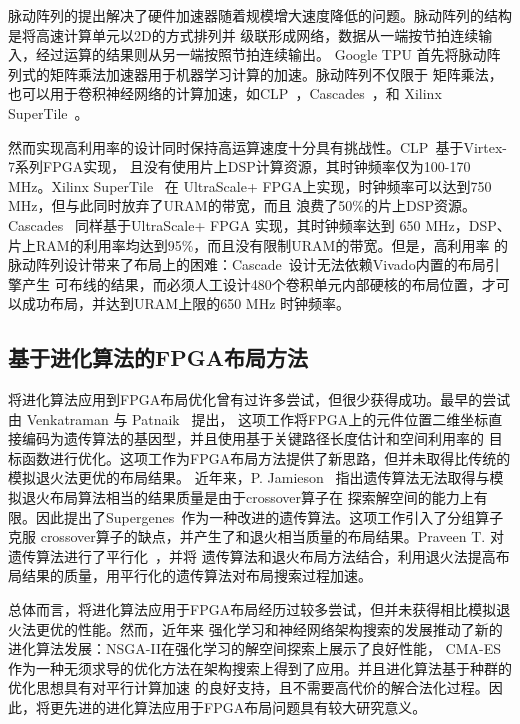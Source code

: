 脉动阵列的提出解决了硬件加速器随着规模增大速度降低的问题。脉动阵列的结构是将高速计算单元以2D的方式排列并
级联形成网络，数据从一端按节拍连续输入，经过运算的结果则从另一端按照节拍连续输出。
Google TPU 首先将脉动阵列式的矩阵乘法加速器用于机器学习计算的加速。脉动阵列不仅限于
矩阵乘法，也可以用于卷积神经网络的计算加速，如CLP~\cite{yongming_systolic-clp_isca2017,yongming_systolic-clp_fpl2016}，Cascades~\cite{nachiket_stc_fpl2019}，和 Xilinx SuperTile~\cite{supertile_fpga19, supertile_fpl17}。

然而实现高利用率的设计同时保持高运算速度十分具有挑战性。CLP~\cite{yongming_systolic-clp_isca2017,yongming_systolic-clp_fpl2016}基于Virtex-7系列FPGA实现，
且没有使用片上DSP计算资源，其时钟频率仅为100-170 MHz。Xilinx SuperTile~\cite{supertile_fpga19, supertile_fpl17} 在
UltraScale+ FPGA上实现，时钟频率可以达到750 MHz，但与此同时放弃了URAM的带宽，而且
浪费了50\%的片上DSP资源。Cascades~\cite{nachiket_stc_fpl2019} 同样基于UltraScale+ FPGA 实现，其时钟频率达到
650 MHz，DSP、片上RAM的利用率均达到95\%，而且没有限制URAM的带宽。但是，高利用率
的脉动阵列设计带来了布局上的困难：Cascade~\cite{nachiket_stc_fpl2019}设计无法依赖Vivado内置的布局引擎产生
可布线的结果，而必须人工设计480个卷积单元内部硬核的布局位置，才可以成功布局，并达到URAM上限的650 MHz
时钟频率。

\subsection{基于进化算法的FPGA布局方法}

将进化算法应用到FPGA布局优化曾有过许多尝试，但很少获得成功。最早的尝试由 Venkatraman 与 Patnaik~\cite{venkatraman2000evolutionary} 提出，
这项工作将FPGA上的元件位置二维坐标直接编码为遗传算法的基因型，并且使用基于关键路径长度估计和空间利用率的
目标函数进行优化。这项工作为FPGA布局方法提供了新思路，但并未取得比传统的模拟退火法更优的布局结果。
近年来，P. Jamieson~\cite{jamieson2010revisiting, jamieson2011exploring} 指出遗传算法无法取得与模拟退火布局算法相当的结果质量是由于crossover算子在
探索解空间的能力上有限。因此提出了Supergenes~\cite{jamieson2013supergenes}作为一种改进的遗传算法。这项工作引入了分组算子克服
crossover算子的缺点，并产生了和退火相当质量的布局结果。Praveen T. 对遗传算法进行了平行化~\cite{praveen2016multi}，并将
遗传算法和退火布局方法结合，利用退火法提高布局结果的质量，用平行化的遗传算法对布局搜索过程加速。

总体而言，将进化算法应用于FPGA布局经历过较多尝试，但并未获得相比模拟退火法更优的性能。然而，近年来
强化学习和神经网络架构搜索的发展推动了新的进化算法发展：NSGA-II在强化学习的解空间探索上展示了良好性能\cite{li2019deep,lu2019nsga}，
CMA-ES作为一种无须求导的优化方法在架构搜索上得到了应用\cite{nn2016cma}。并且进化算法基于种群的优化思想具有对平行计算加速
的良好支持，且不需要高代价的解合法化过程。因此，将更先进的进化算法应用于FPGA布局问题具有较大研究意义。



